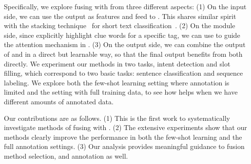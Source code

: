 


Specifically, we explore fusing \RE with \NN from three different aspects: (1) On the \NN input side, we can use the \RE output as features and feed 
to \NN. This shares similar spirit with the stacking technique~\cite{wolpert1992stacked} for short text classification~\cite{wang2017combining}. 
(2) On the \NN module side, since \REs explicitly highlight clue words for a
specific tag, we can use \RE to guide the attention mechanism in \NN. (3) On the \NN output side, we can combine the output of \RE and \NN in
a direct but learnable way, so that the final output benefits from both directly. %
%
We experiment our methods in two  tasks, intent detection
and slot filling, which correspond to two basic \NLP tasks: sentence classification and sequence labeling.
%
We explore both the few-shot learning setting where annotation is limited and the setting with full training data, 
to see how \RE helps when we have different amounts of annotated data.

Our contributions are as follows. (1) This is the first work to systematically investigate methods of fusing \RE with \NN. (2) The
extensive experiments show that our methods clearly improve the \NN performance in both the few-shot learning and the
full annotation settings. (3) Our analysis provides meaningful guidance to fusion method selection, and \RE annotation as well.
